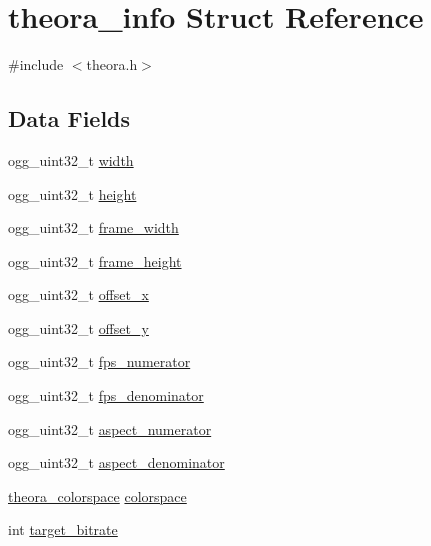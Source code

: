 \hypertarget{structtheora__info}{}\section{theora\+\_\+info Struct Reference}
\label{structtheora__info}


{\ttfamily \#include $<$theora.\+h$>$}

\subsection*{Data Fields}
\begin{DoxyCompactItemize}
\item 
ogg\+\_\+uint32\+\_\+t \hyperlink{structtheora__info_a17c2fc651bb3329f1ea6b13ff1d3957b}{width}
\item 
ogg\+\_\+uint32\+\_\+t \hyperlink{structtheora__info_ae6f0274fc4a7f285c422d91abb35f9c6}{height}
\item 
ogg\+\_\+uint32\+\_\+t \hyperlink{structtheora__info_a8f28f4018a25634d40e4ae861fbbccfa}{frame\+\_\+width}
\item 
ogg\+\_\+uint32\+\_\+t \hyperlink{structtheora__info_a287e4c194f1d2e6deb39d59f1748ea48}{frame\+\_\+height}
\item 
ogg\+\_\+uint32\+\_\+t \hyperlink{structtheora__info_af5949a02bef29512f2705e6f6c944e3b}{offset\+\_\+x}
\item 
ogg\+\_\+uint32\+\_\+t \hyperlink{structtheora__info_a91c3922097ba32a85acd584a01dc2c93}{offset\+\_\+y}
\item 
ogg\+\_\+uint32\+\_\+t \hyperlink{structtheora__info_a3478199aa5ab213816c1819f70085ad7}{fps\+\_\+numerator}
\item 
ogg\+\_\+uint32\+\_\+t \hyperlink{structtheora__info_a9aa7e826e0323a4ae8cd8646a6cfbfea}{fps\+\_\+denominator}
\item 
ogg\+\_\+uint32\+\_\+t \hyperlink{structtheora__info_a5a3ed8c79815fba1aa06c3f7d8e48b35}{aspect\+\_\+numerator}
\item 
ogg\+\_\+uint32\+\_\+t \hyperlink{structtheora__info_afebc4d0cbfb34b68c833a8c79e83ae12}{aspect\+\_\+denominator}
\item 
\hyperlink{group__oldfuncs_gaa567da4ce591f7373149ce3ef3acdac9}{theora\+\_\+colorspace} \hyperlink{structtheora__info_a5eaba99c96706d47b426ab7b7602dc5d}{colorspace}
\item 
int \hyperlink{structtheora__info_a0cfba041767ae2416dd190a406afe713}{target\+\_\+bitrate}
\item 

\end{DoxyCompactItemize}
